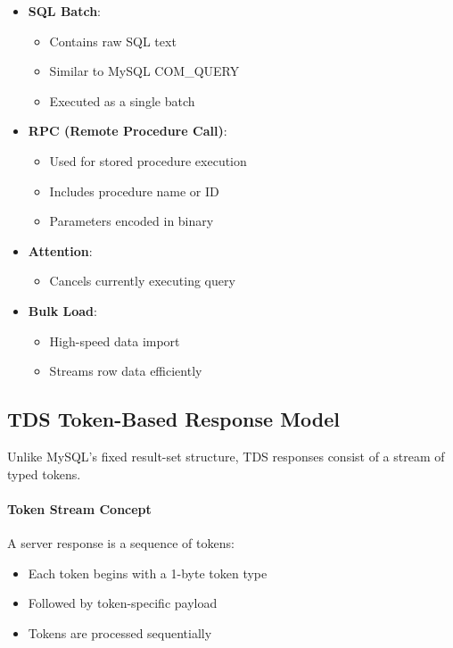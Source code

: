 \begin{itemize}
    \item \textbf{SQL Batch}:
    \begin{itemize}
        \item Contains raw SQL text
        \item Similar to MySQL COM\_QUERY
        \item Executed as a single batch
    \end{itemize}
    
    \item \textbf{RPC (Remote Procedure Call)}:
    \begin{itemize}
        \item Used for stored procedure execution
        \item Includes procedure name or ID
        \item Parameters encoded in binary
    \end{itemize}
    
    \item \textbf{Attention}:
    \begin{itemize}
        \item Cancels currently executing query
    \end{itemize}
    
    \item \textbf{Bulk Load}:
    \begin{itemize}
        \item High-speed data import
        \item Streams row data efficiently
    \end{itemize}
\end{itemize}

\subsection{TDS Token-Based Response Model}

Unlike MySQL’s fixed result-set structure, TDS responses consist of a stream of typed tokens.

\paragraph{Token Stream Concept}

A server response is a sequence of tokens:
\begin{itemize}
    \item Each token begins with a 1-byte token type
    \item Followed by token-specific payload
    \item Tokens are processed sequentially
\end{itemize}

